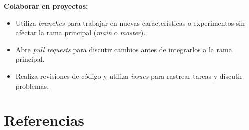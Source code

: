 \documentclass[
]{book}
\providecommand{\tightlist}{%
  \setlength{\itemsep}{0pt}\setlength{\parskip}{0pt}}
\begin{document}
\textbf{Colaborar en proyectos:}

\begin{itemize}
\tightlist
\item
  Utiliza \emph{branches} para trabajar en nuevas características o experimentos sin afectar la rama principal (\emph{main} o \emph{master}).
\item
  Abre \emph{pull requests} para discutir cambios antes de integrarlos a la rama principal.
\item
  Realiza revisiones de código y utiliza \emph{issues} para rastrear tareas y discutir problemas.
\end{itemize}

\chapter{Referencias}\label{referencias}

  
\end{document}
